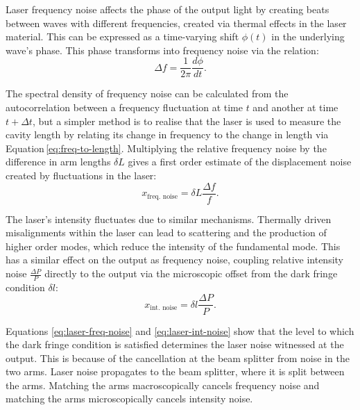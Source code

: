 Laser frequency noise affects the phase of the output light by creating beats between waves with different frequencies, created via thermal effects in the laser material. This can be expressed as a time-varying shift $\phi \left( t \right)$ in the underlying wave's phase. This phase transforms into frequency noise via the relation:
\begin{equation}
  \Delta f = \frac{1}{2 \pi} \frac{d \phi}{dt}.
\end{equation}

The spectral density of frequency noise can be calculated from the autocorrelation between a frequency fluctuation at time $t$ and another at time $t + \Delta t$, but a simpler method is to realise that the laser is used to measure the cavity length by relating its change in frequency to the change in length via Equation\,\ref{eq:freq-to-length}. Multiplying the relative frequency noise by the difference in arm lengths $\delta L$ gives a first order estimate of the displacement noise created by fluctuations in the laser:
\begin{equation}
  \label{eq:laser-freq-noise}
  x_{\text{freq. noise}} = \delta L \frac{\Delta f}{f}.
\end{equation}

The laser's intensity fluctuates due to similar mechanisms. Thermally driven misalignments within the laser can lead to scattering and the production of higher order modes, which reduce the intensity of the fundamental mode. This has a similar effect on the output as frequency noise, coupling relative intensity noise $\frac{\Delta P}{P}$ directly to the output via the microscopic offset from the dark fringe condition $\delta l$:
\begin{equation}
  \label{eq:laser-int-noise}
  x_{\text{int. noise}} = \delta l \frac{\Delta P}{P}.
\end{equation}

Equations \ref{eq:laser-freq-noise} and \ref{eq:laser-int-noise} show that the level to which the dark fringe condition is satisfied determines the laser noise witnessed at the output. This is because of the cancellation at the beam splitter from noise in the two arms. Laser noise propagates to the beam splitter, where it is split between the arms. Matching the arms macroscopically cancels frequency noise and matching the arms microscopically cancels intensity noise.

